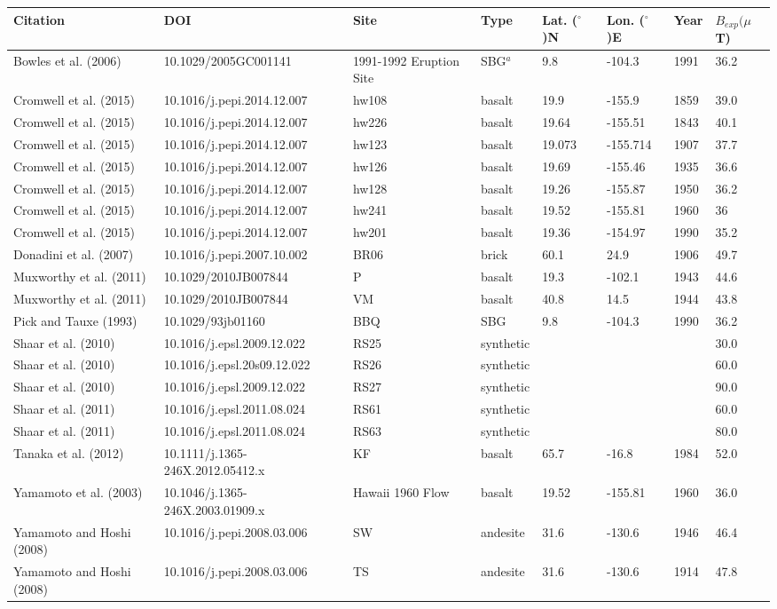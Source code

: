 {{\begin{tabular}{llllllll}
\hline
Citation & DOI & Site & Type & Lat. ($^{\circ}$)N & Lon. ($^{\circ}$)E & Year & $B_{exp} (\mu$T)\\
\hline
Bowles et al. (2006) & 10.1029/2005GC001141 & 1991-1992 Eruption Site & SBG$^a$ & 9.8 & -104.3 & 1991 & 36.2\\
Cromwell et al. (2015) & 10.1016/j.pepi.2014.12.007 & hw108 & basalt & 19.9 & -155.9 & 1859 & 39.0\\
Cromwell et al. (2015) & 10.1016/j.pepi.2014.12.007 & hw226 & basalt & 19.64 & -155.51 & 1843 & 40.1\\
Cromwell et al. (2015) & 10.1016/j.pepi.2014.12.007 & hw123 & basalt & 19.073 & -155.714 & 1907 & 37.7\\
Cromwell et al. (2015) & 10.1016/j.pepi.2014.12.007 & hw126 & basalt & 19.69 & -155.46 & 1935 & 36.6\\
Cromwell et al. (2015) & 10.1016/j.pepi.2014.12.007 & hw128 & basalt& 19.26 & -155.87 & 1950 & 36.2\\
Cromwell et al. (2015) & 10.1016/j.pepi.2014.12.007 & hw241 &basalt & 19.52 & -155.81 & 1960 & 36\\
Cromwell et al. (2015) & 10.1016/j.pepi.2014.12.007 & hw201 & basalt & 19.36 & -154.97 & 1990 & 35.2\\
Donadini et al. (2007) & 10.1016/j.pepi.2007.10.002 & BR06 & brick & 60.1 & 24.9 & 1906 & 49.7\\
Muxworthy et al. (2011) & 10.1029/2010JB007844 & P & basalt& 19.3 & -102.1 & 1943 & 44.6\\
Muxworthy et al. (2011) & 10.1029/2010JB007844 & VM & basalt & 40.8 & 14.5 & 1944 & 43.8\\
Pick and Tauxe (1993) & 10.1029/93jb01160  & BBQ & SBG& 9.8 & -104.3 & 1990 & 36.2\\
Shaar et al. (2010) & 10.1016/j.epsl.2009.12.022 & RS25 & synthetic &  &  &  & 30.0\\
Shaar et al. (2010) & 10.1016/j.epsl.20s09.12.022 & RS26 & synthetic &  &  &  & 60.0\\
Shaar et al. (2010) & 10.1016/j.epsl.2009.12.022 & RS27 & synthetic &  &  &  & 90.0\\
Shaar et al. (2011) & 10.1016/j.epsl.2011.08.024 & RS61 & synthetic &  &  &  & 60.0\\
Shaar et al. (2011) & 10.1016/j.epsl.2011.08.024 & RS63 & synthetic &  &  &  & 80.0\\
Tanaka et al. (2012) & 10.1111/j.1365-246X.2012.05412.x & KF &basalt & 65.7 & -16.8 & 1984 & 52.0\\
Yamamoto et al. (2003) & 10.1046/j.1365-246X.2003.01909.x & Hawaii 1960 Flow&basalt & 19.52& -155.81 & 1960 & 36.0\\
Yamamoto and Hoshi (2008) & 10.1016/j.pepi.2008.03.006 & SW & andesite & 31.6 & -130.6 & 1946 & 46.4\\
Yamamoto and Hoshi (2008) & 10.1016/j.pepi.2008.03.006 & TS & andesite & 31.6 & -130.6 & 1914 & 47.8\\
\hline


\end{tabular}}}
